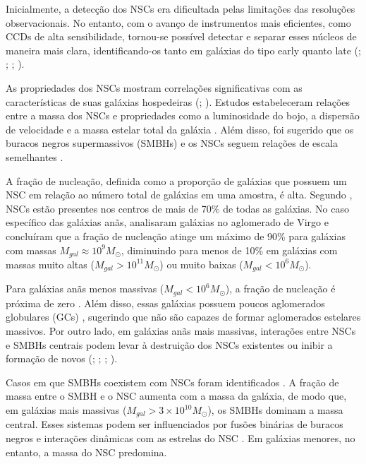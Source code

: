 Inicialmente, a detecção dos NSCs era dificultada pelas limitações das resoluções observacionais. No entanto, com o avanço de instrumentos mais eficientes, como CCDs de alta sensibilidade, tornou-se possível detectar e separar esses núcleos de maneira mais clara, identificando-os tanto em galáxias do tipo early quanto late (\citealp{Phillips_1996}; \citealp{Carollo_1997}; \citealp{Matthews_1999}; \citealp{boker_2002}).

As propriedades dos NSCs mostram correlações significativas com as características de suas galáxias hospedeiras (\citealp{Balcells_2003}; \citealp{Graham_2003}). Estudos estabeleceram relações entre a massa dos NSCs e propriedades como a luminosidade do bojo, a dispersão de velocidade e a massa estelar total da galáxia \citep{Ferrarese_2006, Wehner_2006, Rossa_2006}. Além disso, foi sugerido que os buracos negros supermassivos (SMBHs) e os NSCs seguem relações de escala semelhantes \citep{Ferrarese_2006}.

A fração de nucleação, definida como a proporção de galáxias que possuem um NSC em relação ao número total de galáxias em uma amostra, é alta. Segundo \cite{Boker_2010}, NSCs estão presentes nos centros de mais de 70\% de todas as galáxias. No caso específico das galáxias anãs, \cite{Sanchez_2019} analisaram galáxias no aglomerado de Virgo e concluíram que a fração de nucleação atinge um máximo de 90\% para galáxias com massas $M_{gal} \approx 10^9 M_{\odot}$, diminuindo para menos de 10\% em galáxias com massas muito altas ($M_{gal} > 10^{11} M_{\odot}$) ou muito baixas ($M_{gal} < 10^6 M_{\odot}$).

Para galáxias anãs menos massivas ($M_{gal} < 10^6 M_{\odot}$), a fração de nucleação é próxima de zero \citep{Ordenes_2018}. Além disso, essas galáxias possuem poucos aglomerados globulares (GCs) \citep{Forbes_2018}, sugerindo que não são capazes de formar aglomerados estelares massivos. Por outro lado, em galáxias anãs mais massivas, interações entre NSCs e SMBHs centrais podem levar à destruição dos NSCs existentes ou inibir a formação de novos (\citealp{Cote_2006}; \citealp{Neumayer_2012}; \citealp{Antonini_2015}; \citealp{Arca_2016}).

Casos em que SMBHs coexistem com NSCs foram identificados \citep{Graham_2009}. A fração de massa entre o SMBH e o NSC aumenta com a massa da galáxia, de modo que, em galáxias mais massivas ($M_{gal} > 3 \times 10^{10} M_{\odot}$), os SMBHs dominam a massa central. Esses sistemas podem ser influenciados por fusões binárias de buracos negros e interações dinâmicas com as estrelas do NSC \citep{Antonini_2015}. Em galáxias menores, no entanto, a massa do NSC predomina.

